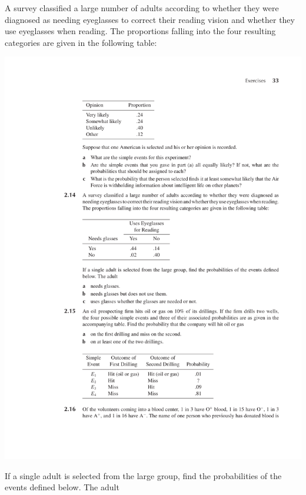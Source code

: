 \documentclass[12pt,reqno]{amsart}
\begin{document}
\bigskip
\prob A survey classified a large number of adults according to whether they were diagnosed as needing eyeglasses to correct their reading vision and whether they use eyeglasses when reading. The proportions falling into the four resulting categories are given in the following table:

\medskip
\begin{center}
\includegraphics[scale=1]{img.pdf}
\end{center}
\medskip

If a single adult is selected from the large group, find the probabilities of the events defined below. The adult
\end{document}
